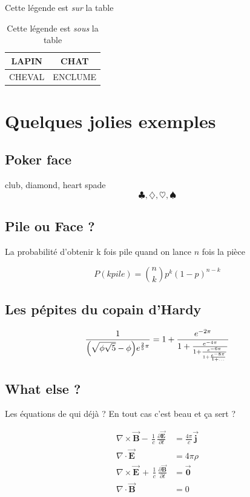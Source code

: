 \documentclass[twocolumn,a4paper]{IEEEtranfr}
\begin{document}
\begin{table}[htbp]
\caption{Cette légende  est \emph{sur} la table}
\centering{}
\begin{tabular}{|c|c|}
\hline 
LAPIN & CHAT \tabularnewline
\hline
\hline 
CHEVAL  & ENCLUME \tabularnewline
\hline
\end{tabular}
\caption{Cette légende  est \emph{sous} la table}
\end{table}
 
\section{Quelques jolies exemples}

\subsection{Poker face}

club, diamond, heart spade
$$\clubsuit, \diamondsuit, \heartsuit ,\spadesuit$$

\subsection{Pile ou Face ? }

La probabilité d'obtenir k fois pile quand on lance $n$ fois la pièce

\begin{equation}
    P(k pile)   = {n \choose k} p^k (1-p)^{ n-k}
\end{equation}

\subsection{Les pépites du copain d'Hardy}

\begin{equation}
  \frac{1}{\Bigl(\sqrt{\phi \sqrt{5}}-\phi\Bigr) e^{\frac25 \pi}} =
  1+\frac{e^{-2\pi}} {1+\frac{e^{-4\pi}} {1+\frac{e^{-6\pi}}
  {1+\frac{e^{-8\pi}} {1+\ldots} } } }
\end{equation}

\subsection{What else ? }

Les équations de qui déjà ? En tout cas c'est beau et ça sert ?

\begin{equation}
\begin{aligned}
    \nabla \times \vec{\mathbf{B}} -\, \frac1c\,
    \frac{\partial\vec{\mathbf{E}}}{\partial t} & = \frac{4\pi}{c}\vec{\mathbf{j}} \\  
    \nabla \cdot \vec{\mathbf{E}} & = 4 \pi \rho \\
    \nabla \times \vec{\mathbf{E}}\, +\, \frac1c\,
    \frac{\partial\vec{\mathbf{B}}}{\partial t} & = \vec{\mathbf{0}} \\
    \nabla \cdot \vec{\mathbf{B}} & = 0
\end{aligned}
\end{equation}
\end{document}
